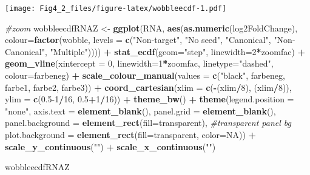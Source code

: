 \documentclass[
]{article}
\newenvironment{Shaded}{\begin{snugshade}}{\end{snugshade}}
\newcommand{\AttributeTok}[1]{\textcolor[rgb]{0.13,0.29,0.53}{#1}}
\newcommand{\CommentTok}[1]{\textcolor[rgb]{0.56,0.35,0.01}{\textit{#1}}}
\newcommand{\ConstantTok}[1]{\textcolor[rgb]{0.56,0.35,0.01}{#1}}
\newcommand{\DecValTok}[1]{\textcolor[rgb]{0.00,0.00,0.81}{#1}}
\newcommand{\FloatTok}[1]{\textcolor[rgb]{0.00,0.00,0.81}{#1}}
\newcommand{\FunctionTok}[1]{\textcolor[rgb]{0.13,0.29,0.53}{\textbf{#1}}}
\newcommand{\NormalTok}[1]{#1}
\newcommand{\OtherTok}[1]{\textcolor[rgb]{0.56,0.35,0.01}{#1}}
\newcommand{\SpecialCharTok}[1]{\textcolor[rgb]{0.81,0.36,0.00}{\textbf{#1}}}
\newcommand{\StringTok}[1]{\textcolor[rgb]{0.31,0.60,0.02}{#1}}
\begin{document}
\texttt{[image: Fig4\_2\_files/figure-latex/wobbleecdf-1.pdf]}

\begin{Shaded}
\begin{Highlighting}[]
\CommentTok{\#zoom}
\NormalTok{wobbleecdfRNAZ }\OtherTok{\textless{}{-}} \FunctionTok{ggplot}\NormalTok{(RNA, }\FunctionTok{aes}\NormalTok{(}\FunctionTok{as.numeric}\NormalTok{(log2FoldChange), }\AttributeTok{colour=}\FunctionTok{factor}\NormalTok{(wobble, }\AttributeTok{levels =} \FunctionTok{c}\NormalTok{(}\StringTok{"Non{-}target"}\NormalTok{, }\StringTok{"No seed"}\NormalTok{, }\StringTok{"Canonical"}\NormalTok{, }\StringTok{"Non{-}Canonical"}\NormalTok{, }\StringTok{"Multiple"}\NormalTok{)))) }\SpecialCharTok{+} 
  \FunctionTok{stat\_ecdf}\NormalTok{(}\AttributeTok{geom=}\StringTok{"step"}\NormalTok{, }\AttributeTok{linewidth=}\DecValTok{2}\SpecialCharTok{*}\NormalTok{zoomfac) }\SpecialCharTok{+}
  \FunctionTok{geom\_vline}\NormalTok{(}\AttributeTok{xintercept =} \DecValTok{0}\NormalTok{, }\AttributeTok{linewidth=}\DecValTok{1}\SpecialCharTok{*}\NormalTok{zoomfac, }\AttributeTok{linetype=}\StringTok{"dashed"}\NormalTok{, }\AttributeTok{colour=}\NormalTok{farbeneg) }\SpecialCharTok{+}
  \FunctionTok{scale\_colour\_manual}\NormalTok{(}\AttributeTok{values =} \FunctionTok{c}\NormalTok{(}\StringTok{"black"}\NormalTok{, farbeneg, farbe1, farbe2, farbe3)) }\SpecialCharTok{+}
  \FunctionTok{coord\_cartesian}\NormalTok{(}\AttributeTok{xlim =} \FunctionTok{c}\NormalTok{(}\SpecialCharTok{{-}}\NormalTok{(xlim}\SpecialCharTok{/}\DecValTok{8}\NormalTok{), (xlim}\SpecialCharTok{/}\DecValTok{8}\NormalTok{)), }\AttributeTok{ylim =} \FunctionTok{c}\NormalTok{(}\FloatTok{0.5}\DecValTok{{-}1}\SpecialCharTok{/}\DecValTok{16}\NormalTok{, }\FloatTok{0.5}\SpecialCharTok{+}\DecValTok{1}\SpecialCharTok{/}\DecValTok{16}\NormalTok{)) }\SpecialCharTok{+} 
  \FunctionTok{theme\_bw}\NormalTok{() }\SpecialCharTok{+}
  \FunctionTok{theme}\NormalTok{(}\AttributeTok{legend.position =} \StringTok{"none"}\NormalTok{, }\AttributeTok{axis.text =} \FunctionTok{element\_blank}\NormalTok{(), }\AttributeTok{panel.grid =} \FunctionTok{element\_blank}\NormalTok{(),}
        \AttributeTok{panel.background =} \FunctionTok{element\_rect}\NormalTok{(}\AttributeTok{fill=}\StringTok{\textquotesingle{}transparent\textquotesingle{}}\NormalTok{), }\CommentTok{\#transparent panel bg}
        \AttributeTok{plot.background =} \FunctionTok{element\_rect}\NormalTok{(}\AttributeTok{fill=}\StringTok{\textquotesingle{}transparent\textquotesingle{}}\NormalTok{, }\AttributeTok{color=}\ConstantTok{NA}\NormalTok{)) }\SpecialCharTok{+}
  \FunctionTok{scale\_y\_continuous}\NormalTok{(}\StringTok{""}\NormalTok{) }\SpecialCharTok{+} \FunctionTok{scale\_x\_continuous}\NormalTok{(}\StringTok{""}\NormalTok{)}


\NormalTok{wobbleecdfRNAZ}
\end{Highlighting}
\end{Shaded}
\end{document}
